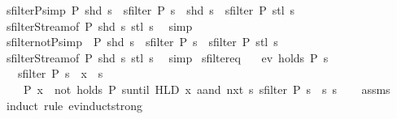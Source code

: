 \begin{isabellebody}
\ sfilter{\isacharunderscore}P{\isacharbrackleft}simp{\isacharbrackright}{\isacharcolon}\ {\isachardoublequoteopen}P\ {\isacharparenleft}shd\ s{\isacharparenright}\ {\isasymLongrightarrow}\ sfilter\ P\ s\ {\isacharequal}\ shd\ s\ {\isacharhash}{\isacharhash}\ sfilter\ P\ {\isacharparenleft}stl\ s{\isacharparenright}{\isachardoublequoteclose}\isanewline
%
\isadelimproof
\ \ %
\endisadelimproof
%
\isatagproof
{}\isamarkupfalse%
\ sfilter{\isacharunderscore}Stream{\isacharbrackleft}of\ P\ {\isachardoublequoteopen}shd\ s{\isachardoublequoteclose}\ {\isachardoublequoteopen}stl\ s{\isachardoublequoteclose}{\isacharbrackright}\ \isamarkupfalse%
\ simp%
\endisatagproof
{\isafoldproof}%
%
\isadelimproof
\isanewline
%
\endisadelimproof
\isanewline
{}\isamarkupfalse%
\ sfilter{\isacharunderscore}not{\isacharunderscore}P{\isacharbrackleft}simp{\isacharbrackright}{\isacharcolon}\ {\isachardoublequoteopen}{\isasymnot}\ P\ {\isacharparenleft}shd\ s{\isacharparenright}\ {\isasymLongrightarrow}\ sfilter\ P\ s\ {\isacharequal}\ sfilter\ P\ {\isacharparenleft}stl\ s{\isacharparenright}{\isachardoublequoteclose}\isanewline
%
\isadelimproof
\ \ %
\endisadelimproof
%
\isatagproof
{}\isamarkupfalse%
\ sfilter{\isacharunderscore}Stream{\isacharbrackleft}of\ P\ {\isachardoublequoteopen}shd\ s{\isachardoublequoteclose}\ {\isachardoublequoteopen}stl\ s{\isachardoublequoteclose}{\isacharbrackright}\ \isamarkupfalse%
\ simp%
\endisatagproof
{\isafoldproof}%
%
\isadelimproof
\isanewline
%
\endisadelimproof
\isanewline
{}\isamarkupfalse%
\ sfilter{\isacharunderscore}eq{\isacharcolon}\isanewline
\ \ \ {\isachardoublequoteopen}ev\ {\isacharparenleft}holds\ P{\isacharparenright}\ s{\isachardoublequoteclose}\isanewline
\ \ \ {\isachardoublequoteopen}sfilter\ P\ s\ {\isacharequal}\ x\ {\isacharhash}{\isacharhash}\ s{\isacharprime}\ {\isasymlongleftrightarrow}\isanewline
\ \ \ \ P\ x\ {\isasymand}\ {\isacharparenleft}not\ {\isacharparenleft}holds\ P{\isacharparenright}\ suntil\ {\isacharparenleft}HLD\ {\isacharbraceleft}x{\isacharbraceright}\ aand\ nxt\ {\isacharparenleft}{\isasymlambda}s{\isachardot}\ sfilter\ P\ s\ {\isacharequal}\ s{\isacharprime}{\isacharparenright}{\isacharparenright}{\isacharparenright}\ s{\isachardoublequoteclose}\isanewline
%
\isadelimproof
\ \ %
\endisadelimproof
%
\isatagproof
{}\isamarkupfalse%
\ assms\isanewline
\ \ \isamarkupfalse%
\ {\isacharparenleft}induct\ rule{\isacharcolon}\ ev{\isacharunderscore}induct{\isacharunderscore}strong{\isacharparenright}\isanewline

\end{isabellebody}
